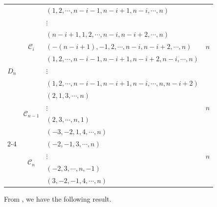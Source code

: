 \documentclass[11pt, reqno]{amsart}
\theoremstyle{definition}
\numberwithin{equation}{section}
\begin{document}
\begin{table}[!htbp]
{\begin{minipage}{\textwidth}
\begin{tabular}{c|c|l|c}
\multirow{11}{*}{$D_n$}
  & \multirow{7}{*}{$\mathcal{C}_i$}     & $(1,2,\cdots,n-i-1,n-i+1,n-i,\cdots,n)$ & \multirow{7}{*}{$n$} \\ 
   &                                     & \quad \quad \quad  $\vdots$ &                         \\ 
    &                                     & $(n-i+1,1,2,\cdots,n-i,n-i+2,\cdots,n)$ &                         \\ 
	&                                     & $(-(n-i+1),-1,2,\cdots,n-i,n-i+2,\cdots,n)$ &                         \\ 
	 &                                   & $(1,2,\cdots,n-i-1,n-i+1,n-i+2,n-i,\cdots,n)$ &                         \\ 
	  &                                     & \quad \quad \quad $\vdots$ &                         \\ 
  &                                     & $(1,2,\cdots,n-i-1,n-i+1,n-i,\cdots,n,n-i+2)$ &                         
    \\ \cline{2-4}
  & \multirow{4}{*}{$\mathcal{C}_{n-1}$} & $(2,1,3,\cdots,n)$\\
  && \quad \quad \quad $\vdots$ & \multirow{1}{*}{$n$}\\
  && $(2,3,\cdots,n,1)$\\
  &&$(-3,-2,1,4,\cdots,n)$       \\ \cline{2-4}
  & \multirow{4}{*}{$\mathcal{C}_n$}     &$(-2,-1,3,\cdots,n)$\\
  && \quad \quad \quad  $\vdots$ & \multirow{1}{*}{$n$} \\
  & & $(-2,3,\cdots,n,-1)$\\
  && $(3,-2,-1,4,\cdots,n)$  \\ \hline
\end{tabular}%
\vspace{0.5em}
\label{Elements-in-cell}
\end{minipage}
}
\end{table}




From \cite[Table 1]{BKOP}, we have the following result.
\end{document}
